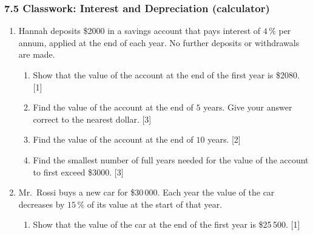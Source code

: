 \documentclass[12pt, twoside]{article}
\begin{document}
\subsubsection*{7.5 Classwork: Interest and Depreciation (calculator)}

\begin{enumerate}[itemsep=0.4cm]

\item[1.] [Maximum mark: 9]

Hannah deposits \$2000 in a savings account that pays interest of $4\,\%$ per
annum, applied at the end of each year. No further deposits or withdrawals are
made.

\begin{enumerate}[itemsep=0.4cm]
  \item Show that the value of the account at the end of the first year is
  \$2080. \hfill [1]

  \vspace{2.5cm}

  \item Find the value of the account at the end of $5$ years. Give your answer
  correct to the nearest dollar. \hfill [3]

  \vspace{4.5cm}

  \item Find the value of the account at the end of $10$ years. \hfill [2]

  \vspace{3.5cm}

  \item Find the smallest number of full years needed for the value of the
  account to first exceed \$3000. \hfill [3]

  \vspace{5cm}
\end{enumerate}

\newpage

\item[2.] [Maximum mark: 10]

Mr.\ Rossi buys a new car for \$30\,000. Each year the value of the car
decreases by $15\,\%$ of its value at the start of that year.

\begin{enumerate}[itemsep=0.4cm]
  \item Show that the value of the car at the end of the first year is
  \$25\,500. \hfill [1]


\end{enumerate}
\end{enumerate}
\end{document}
